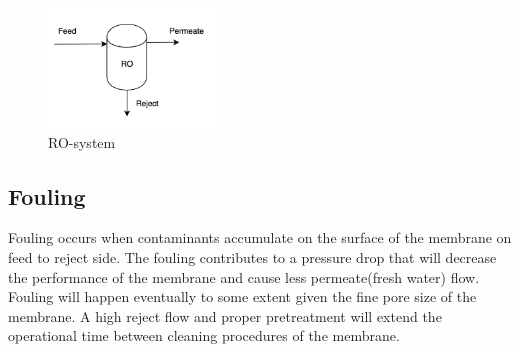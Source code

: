 \begin{figure}[h]
    \centering
    \includegraphics[width=0.4\textwidth]{ROsystem}
    \caption{RO-system}
    \label{fig:ROsystem}
\end{figure}





\subsection{Fouling}
Fouling occurs when contaminants accumulate on the surface of the membrane on feed to reject side. The fouling contributes to a pressure drop that will decrease the performance of the membrane and cause less permeate(fresh water) flow. Fouling will happen eventually to some extent given the fine pore size of the membrane. A high reject flow and proper pretreatment will extend the operational time between cleaning procedures of the membrane\cite{Puretech}. 

